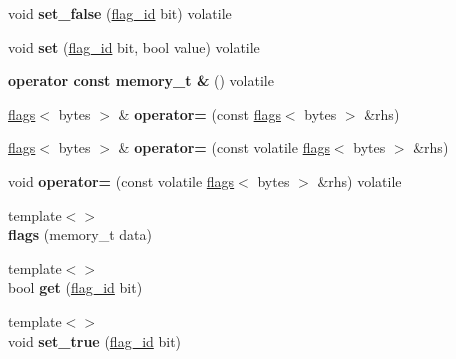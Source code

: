 \begin{DoxyCompactItemize}
void {\bfseries set\+\_\+false} (\mbox{\hyperlink{classfsl_1_1lg_1_1range__int}{flag\+\_\+id}} bit) volatile
\item 
\mbox{\label{classfsl_1_1lg_1_1flags_a8e91be95b2aec14f2dc0f53d08b70582}} 
void {\bfseries set} (\mbox{\hyperlink{classfsl_1_1lg_1_1range__int}{flag\+\_\+id}} bit, bool value) volatile
\item 
\mbox{\label{classfsl_1_1lg_1_1flags_afe7afcc54d65a797fec2d926a5f2458d}} 
{\bfseries operator const memory\+\_\+t \&} () volatile
\item 
\mbox{\label{classfsl_1_1lg_1_1flags_aed3945d31ba6ec340c545b378748e0df}} 
\mbox{\hyperlink{classfsl_1_1lg_1_1flags}{flags}}$<$ bytes $>$ \& {\bfseries operator=} (const \mbox{\hyperlink{classfsl_1_1lg_1_1flags}{flags}}$<$ bytes $>$ \&rhs)
\item 
\mbox{\label{classfsl_1_1lg_1_1flags_ae351f887177bdd2bdf0594fb9be2f0f0}} 
\mbox{\hyperlink{classfsl_1_1lg_1_1flags}{flags}}$<$ bytes $>$ \& {\bfseries operator=} (const volatile \mbox{\hyperlink{classfsl_1_1lg_1_1flags}{flags}}$<$ bytes $>$ \&rhs)
\item 
\mbox{\label{classfsl_1_1lg_1_1flags_a811311852b3a74ff4f14e70df6a63f36}} 
void {\bfseries operator=} (const volatile \mbox{\hyperlink{classfsl_1_1lg_1_1flags}{flags}}$<$ bytes $>$ \&rhs) volatile
\item 
\mbox{\label{classfsl_1_1lg_1_1flags_ad80d14dfc2973c7b80553ad183c01a33}} 
{\footnotesize template$<$$>$ }\\{\bfseries flags} (memory\+\_\+t data)
\item 
\mbox{\label{classfsl_1_1lg_1_1flags_a53b37d63305122e6a0df4d4b2f97382d}} 
{\footnotesize template$<$$>$ }\\bool {\bfseries get} (\mbox{\hyperlink{classfsl_1_1lg_1_1range__int}{flag\+\_\+id}} bit)
\item 
\mbox{\label{classfsl_1_1lg_1_1flags_a6197dedb8567fd1f00304071a5650c77}} 
{\footnotesize template$<$$>$ }\\void {\bfseries set\+\_\+true} (\mbox{\hyperlink{classfsl_1_1lg_1_1range__int}{flag\+\_\+id}} bit)

\end{DoxyCompactItemize}
